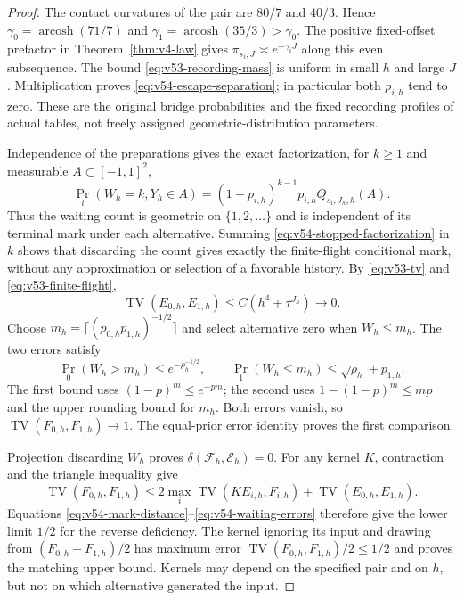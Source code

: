 \begin{proof}
The contact curvatures of the pair are $80/7$ and $40/3$.  Hence
$\gamma_0=\operatorname{arcosh}(71/7)$ and
$\gamma_1=\operatorname{arcosh}(35/3)>\gamma_0$.
The positive fixed-offset prefactor in Theorem~\ref{thm:v4-law} gives
$\pi_{s_i,J}\asymp e^{-\gamma_iJ}$ along this even subsequence.
The bound \eqref{eq:v53-recording-mass} is uniform in small $h$ and large
$J$.  Multiplication proves \eqref{eq:v54-escape-separation}; in
particular both $p_{i,h}$ tend to zero.  These are the original bridge
probabilities and the fixed recording profiles of actual tables, not
freely assigned geometric-distribution parameters.

Independence of the preparations gives the exact factorization, for
$k\ge1$ and measurable $A\subset[-1,1]^2$,
\begin{equation}\label{eq:v54-stopped-factorization}
 \Pr_i(W_h=k,Y_h\in A)
   =(1-p_{i,h})^{k-1}p_{i,h}Q_{s_i,J_h,h}(A).
\end{equation}
Thus the waiting count is geometric on $\{1,2,\ldots\}$ and is
independent of its terminal mark under each alternative.  Summing
\eqref{eq:v54-stopped-factorization} in $k$ shows that discarding the
count gives exactly the finite-flight conditional mark, without any
approximation or selection of a favorable history.
By \eqref{eq:v53-tv} and \eqref{eq:v53-finite-flight},
\begin{equation}\label{eq:v54-mark-distance}
 \operatorname{TV}(E_{0,h},E_{1,h})\le C(h^4+\tau^{J_h})\longrightarrow0.
\end{equation}
Choose $m_h=\lceil(p_{0,h}p_{1,h})^{-1/2}\rceil$ and select alternative
zero when $W_h\le m_h$.  The two errors satisfy
\begin{equation}\label{eq:v54-waiting-errors}
 \Pr_0(W_h>m_h)\le e^{-\rho_h^{-1/2}},\qquad
 \Pr_1(W_h\le m_h)\le \sqrt{\rho_h}+p_{1,h}.
\end{equation}
The first bound uses $(1-p)^m\le e^{-pm}$; the second uses
$1-(1-p)^m\le mp$ and the upper rounding bound for $m_h$.
Both errors vanish, so $\operatorname{TV}(F_{0,h},F_{1,h})\to1$.
The equal-prior error identity proves the first comparison.

Projection discarding $W_h$ proves
$\delta(\mathcal F_h,\mathcal E_h)=0$.  For any kernel $K$, contraction
and the triangle inequality give
\[
 \operatorname{TV}(F_{0,h},F_{1,h})
 \le 2\max_i\operatorname{TV}(KE_{i,h},F_{i,h})
              +\operatorname{TV}(E_{0,h},E_{1,h}).
\]
Equations \eqref{eq:v54-mark-distance}--\eqref{eq:v54-waiting-errors}
therefore give the lower limit $1/2$ for the reverse deficiency.
The kernel ignoring its input and drawing from
$(F_{0,h}+F_{1,h})/2$ has maximum error
$\operatorname{TV}(F_{0,h},F_{1,h})/2\le1/2$ and proves the matching
upper bound.  Kernels may depend on the specified pair and on $h$, but
not on which alternative generated the input.


\end{proof}
